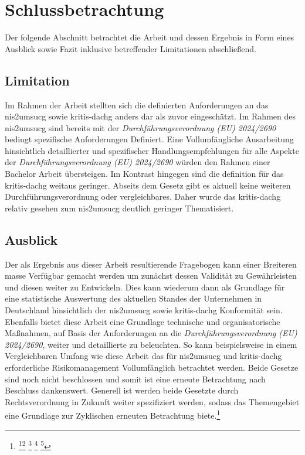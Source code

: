 \documentclass[11pt,a4paper,hidelinks]{article}   %
\begin{document}
    \newpage
    \section{Schlussbetrachtung}
        Der folgende Abschnitt betrachtet die Arbeit und dessen Ergebnis in Form eines Ausblick sowie Fazit inklusive betreffender Limitationen abschließend. 
        \subsection{Limitation}
        Im Rahmen der Arbeit stellten sich die definierten Anforderungen an das \gls{nis2umsucg} sowie \gls{kritis-dachg} anders dar als zuvor eingeschätzt. Im Rahmen des \gls{nis2umsucg} sind bereits mit der \emph{Durchführungsverordnung (EU) 2024/2690} bedingt spezifische Anforderungen Definiert. Eine Vollumfängliche Ausarbeitung hinsichtlich detaillierter und spezifischer Handlungsempfehlungen für alle Aspekte der \emph{Durchführungsverordnung (EU) 2024/2690} würden den Rahmen einer Bachelor Arbeit übersteigen. Im Kontrast hingegen sind die definition für das \gls{kritis-dachg} weitaus geringer. Abseits dem Gesetz gibt es aktuell keine weiteren Durchführungsverordnung oder vergleichbares. Daher wurde das \gls{kritis-dachg} relativ gesehen zum \gls{nis2umsucg} deutlich geringer Thematisiert.
        \subsection{Ausblick}
        Der als Ergebnis aus dieser Arbeit resultierende Fragebogen kann einer Breiteren masse Verfügbar gemacht werden um zunächst dessen Validität zu Gewährleisten und diesen weiter zu Entwickeln. Dies kann wiederum dann als Grundlage für eine statistische Auswertung des aktuellen Standes der Unternehmen in Deutschland hinsichtlich der \gls{nis2umsucg} sowie \gls{kritis-dachg} Konformität sein. Ebenfalls bietet diese Arbeit eine Grundlage technische und organisatorische Maßnahmen, auf Basis der Anforderungen an die \emph{Durchführungsverordnung (EU) 2024/2690}, weiter und detaillierte zu beleuchten. So kann beispielsweise in einem Vergleichbaren Umfang wie diese Arbeit das für \gls{nis2umsucg} und \gls{kritis-dachg} erforderliche Risikomanagement Vollumfänglich betrachtet werden. Beide Gesetze sind noch nicht beschlossen und somit ist eine erneute Betrachtung nach Beschluss dankenswert. Generell ist werden beide Gesetzte durch Rechtsverordnung in Zukunft weiter spezifiziert werden, sodass das Themengebiet eine Grundlage zur Zyklischen erneuten Betrachtung biete.\footnote{
            \footcite[Vgl. §125,][]{BTGO}\footcite[Vgl. S. 1][]{brd:c54cf9}
            \footcite[Vgl. S. 52][]{brd:4a7cbe}
            \footcite[Vgl. S. 2,][]{bmi:98905b}
            \footcite[Vgl. Artikel 80][]{GG}
        }
\end{document}
